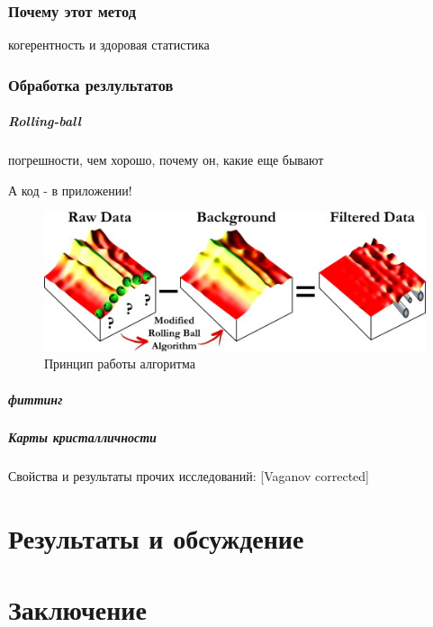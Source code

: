 \documentclass[oneside,final,14pt]{extreport}
\begin{document}
	\subsection{Почему этот метод}
	когерентность и здоровая статистика
	
	\subsection{Обработка резлультатов}
	
	\paragraph{Rolling-ball}
	погрешности, чем хорошо, почему он, какие еще бывают
	
	А код - в приложении!
	
	\begin{figure}
    \includegraphics[width=\textwidth]{rolling-ball.jpg}
    \caption{Принцип работы алгоритма}
    \label{fig:rolling-ball}
\end{figure}

    \paragraph{фиттинг}

	
	\paragraph{Карты кристалличности}
	
	

	
	
	
	Свойства и результаты прочих исследований:
	[Vaganov corrected]
	
	\chapter{Результаты и обсуждение}
	
	\chapter*{Заключение}
	
	
	
\end{document}
